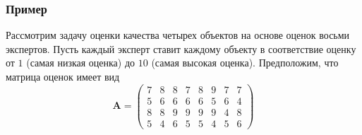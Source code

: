 \documentclass[specialist,
               substylefile = spbu.rtx,
               subf,href,colorlinks=true, 12pt]{disser}
\theoremstyle{definition}
\begin{document}



\subsubsection{Пример}\label{subsec:E1}
Рассмотрим задачу оценки качества четырех объектов на основе оценок восьми экспертов. Пусть каждый эксперт ставит каждому объекту в соответствие оценку от $1$ (самая низкая оценка) до $10$ (самая высокая оценка).  %
Предположим, что матрица оценок имеет вид 
\begin{equation*}
\bm{A}=
\begin{pmatrix}
7 &8 &8 &7 &8 &9 &7 &7\\
5 &6 &6 &6 &6 &5 &6 &4\\
8 &8 &9 &9 &9 &9 &4 &8\\
5 &4 &6 &5 &5 &4 &5 &6
\end{pmatrix}
\end{equation*}
\end{document}
